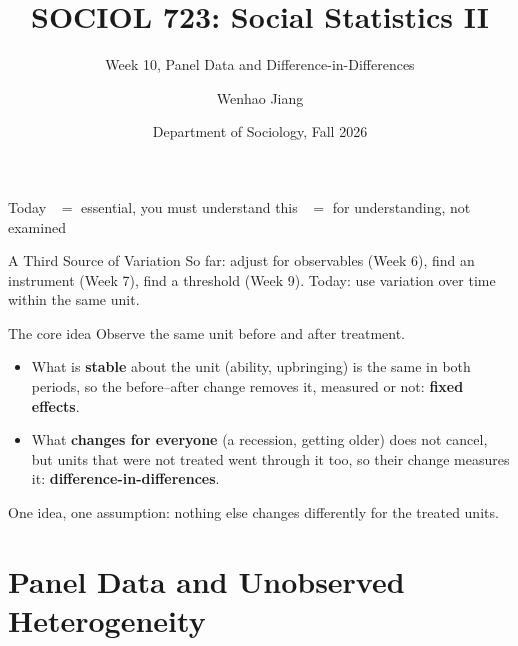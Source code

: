 \documentclass[aspectratio=169,11pt,xcolor=dvipsnames]{beamer}
\title[SOCIOL 723]{SOCIOL 723: Social Statistics II\\[-2pt]}
\subtitle{Week 10, Panel Data and Difference-in-Differences\\[-6pt]}
\author[Jiang]{Wenhao Jiang\vspace{-2.5em}}
\institute[Duke]{}
\date{Department of Sociology, Fall 2026}
\newcommand{\adv}{\,\raisebox{0.6pt}{\textcolor{accent}{$\bigstar$}}}
\newcommand{\core}{\,\raisebox{0.6pt}{\textcolor{corestar}{$\bigstar$}}}
\begin{document}


\begin{frame}[plain]
  \titlepage
\end{frame}

\begin{frame}{Today}
  \tableofcontents
  \vskip6pt
  {\footnotesize \core{} $=$ essential, you must understand this \quad\quad \adv{} $=$ for understanding, not examined}
\end{frame}

\begin{frame}{A Third Source of Variation}
So far: adjust for observables (Week 6), find an instrument (Week 7), find a
threshold (Week 9). Today: use \alert{variation over time within the same unit}.
\vskip6pt
\begin{block}{The core idea}
Observe the same unit before and after treatment.
\begin{itemize}\itemsep2pt
  \item What is \textbf{stable} about the unit (ability, upbringing) is the same in both
        periods, so the before--after change removes it, measured or not:
        \textbf{fixed effects}.
  \item What \textbf{changes for everyone} (a recession, getting older) does not cancel,
        but units that were not treated went through it too, so their change measures
        it: \textbf{difference-in-differences}.
\end{itemize}
\end{block}
\vskip6pt
One idea, one assumption: nothing else changes differently for the treated units.
\end{frame}

\section[Panel Data]{Panel Data and Unobserved Heterogeneity}
\begin{frame}\sectionpage\end{frame}
\end{document}
